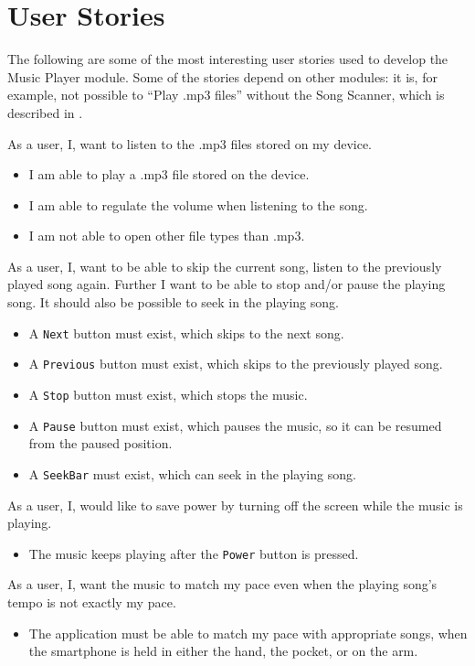 \section{User Stories}
The following are some of the most interesting user stories used to develop the Music Player module. Some of the stories depend on other modules: it is, for example, not possible to ``Play .mp3 files'' without the Song Scanner, which is described in .

{As a user, I, want to listen to the .mp3 files stored on my device.}
{\begin{itemize}
\item I am able to play a .mp3 file stored on the device.
\item I am able to regulate the volume when listening to the song.
\item I am not able to open other file types than .mp3.
\end{itemize}}

{As a user, I, want to be able to skip the current song, listen to the previously played song again. 
Further I want to be able to stop and/or pause the playing song.
It should also be possible to seek in the playing song.}
{\begin{itemize}
\item A \texttt{Next} button must exist, which skips to the next song.
\item A \texttt{Previous} button must exist, which skips to the previously played song.
\item A \texttt{Stop} button must exist, which stops the music.
\item A \texttt{Pause} button must exist, which pauses the music, so it can be resumed from the paused position.
\item A \texttt{SeekBar} must exist, which can seek in the playing song.
\end{itemize}}

{As a user, I, would like to save power by turning off the screen while the music is playing.}
{\begin{itemize}
\item The music keeps playing after the \texttt{Power} button is pressed.
\end{itemize}}

{As a user, I, want the music to match my pace even when the playing song's tempo is not exactly my pace.}
{\begin{itemize}
\item The application must be able to match my pace with appropriate songs, when the smartphone is held in either the hand, the pocket, or on the arm.
\end{itemize}}

